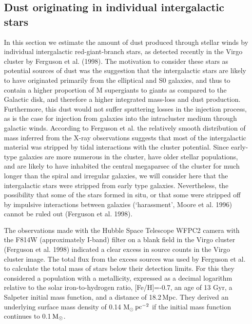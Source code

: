 \documentclass[]{aa}
\begin{document}
\subsection{Dust originating in individual intergalactic stars}

In this section we estimate the amount of dust produced through stellar winds
by individual intergalactic red-giant-branch stars, as
detected recently in the Virgo cluster by Ferguson et al. (1998). The
motivation to consider these stars as potential sources of dust
was the suggestion that the intergalactic stars  are 
likely to have originated primarily from the elliptical and S0 galaxies, and
thus to contain a higher proportion of M supergiants to giants as compared to 
the Galactic disk, and therefore a higher integrated mass-loss and dust 
production. Furthermore, this dust would not suffer sputtering 
losses in the injection process, as is the case for
injection from galaxies into the intracluster medium through galactic winds.
According to Ferguson et al. the 
relatively smooth distribution of mass inferred from the X-ray observations 
suggests that most of the intergalactic material was stripped by tidal 
interactions with the cluster potential. Since early-type galaxies are more 
numerous in the cluster, have older stellar populations, and are likely to 
have inhabited the central megaparsec of the cluster for much longer than the 
spiral and irregular galaxies, we will consider here that the
intergalactic stars were stripped from early type galaxies. Nevertheless,
the possibility that some 
of the stars formed in situ, or that some were stripped off by impulsive 
interactions between galaxies (\lq harassment\rq, Moore et al. 1996) cannot 
be ruled out (Ferguson et al. 1998).

The observations made with the Hubble Space Telescope WFPC2 camera with the
F814W (approximately I-band) filter on a blank field in the Virgo cluster 
(Ferguson et al. 1998) indicated a clear excess 
in source counts in the Virgo cluster image. The total flux from the excess 
sources was used by Ferguson et al. to calculate 
the total mass of stars below their detection limits. For this they
considered a population with a metallicity, expressed as a decimal logarithm
relative to the
solar iron-to-hydrogen ratio, [Fe/H]=-0.7, an age of 13 Gyr, a Salpeter 
initial mass function, and a distance of 18.2\,Mpc. They derived an 
underlying surface mass density of
0.14 M$_{\odot}$\,${\rm pc}^{-2}$ if the initial mass function 
continues to 
0.1\,${\rm M}_{\odot}$. 
\end{document}
